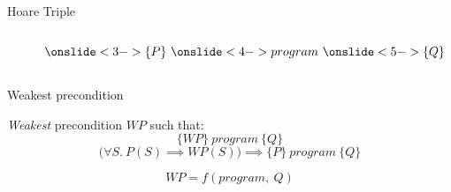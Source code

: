\documentclass{beamer}
\newcommand{\htriple}[3]{\ensuremath{\{#1\}~#2~\{#3\}}}
\newcommand{\WP}{\ensuremath{\mathit{WP}}}
\begin{document}
\begin{frame}{Hoare Triple}
{\begin{columns}
\begin{column}{.5\textwidth}
\begin{center}
                \end{center}
            \end{column}
            \begin{column}{.5\textwidth}
                \begin{center}
                    \begin{equation*}
                        \onslide<3->{\{P\}} ~ \onslide<4->{program} ~ \onslide<5->{\{Q\}}
                    \end{equation*}
                    \bigskip
                \end{center}
            \end{column}
        \end{columns}
    }
\end{frame}

\begin{frame}{Weakest precondition}
    \begin{center}
        \textit{Weakest} precondition $WP$ such that:
        \begin{equation*}
            \htriple{WP}{program}{Q}
        \end{equation*}
        \pause
        \begin{equation*}
            \Big(\forall S.~P(S) \implies WP(S)\Big) \implies \htriple{P}{program}{Q}
        \end{equation*}

        \bigskip
        \pause

        \begin{equation*}
            \WP = f(program,~Q)
        \end{equation*}
    \end{center}
\end{frame}
\end{document}
